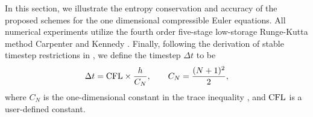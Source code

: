 \documentclass[preprint,10pt]{article}
\theoremstyle{definition}
\theoremstyle{lemma}
\theoremstyle{theorem}
\theoremstyle{assumption}
\newcommand{\pd}[2]{\frac{\partial#1}{\partial#2}}
\newcommand{\LRp}[1]{\left( #1 \right)}
\newcommand{\LRc}[1]{\left\{ #1 \right\}}
\newcommand{\avg}[1] {\ensuremath{\LRc{\!\{#1\}\!}}}
\newcommand{\note}[1]{{\color{blue}{#1}}}
\begin{document}
In this section, we illustrate the entropy conservation and accuracy of the proposed schemes for the one dimensional compressible Euler equations.  
All numerical experiments utilize the fourth order five-stage low-storage Runge-Kutta method Carpenter and Kennedy \cite{carpenter1994fourth}.  Finally, following the derivation of stable timestep restrictions in \cite{chan2015gpu}, we define the timestep $\Delta t$ to be 
\[
\Delta t = {\rm CFL} \times \frac{h}{C_N}, \qquad C_N = \frac{(N+1)^2}{2},
\] 
where $C_N$ is the one-dimensional constant in the trace inequality \cite{warburton2003constants}, and ${\rm CFL}$ is a user-defined constant.  



%
%
%
\end{document}
